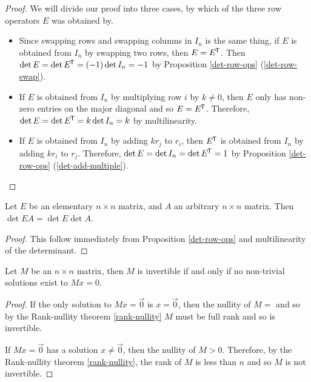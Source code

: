 \begin{proof}
    We will divide our proof into three cases, by which of the three row operators $E$ was obtained by.

    \begin{itemize}
        \item Since swapping rows and swapping columns in $I_n$ is the same thing, if $E$ is obtained from $I_n$ by swapping two rows, then $E = E^{\mkern-1.5mu\mathsf{T}}$. Then $\det E = \det E^{\mkern-1.5mu\mathsf{T}} = (-1)\det I_n = -1$ by Proposition \ref{det-row-ops} (\ref{det-row-swap}).
        \item If $E$ is obtained from $I_n$ by multiplying row $i$ by $k \neq 0$, then $E$ only has non-zero entries on the major diagonal and so $E = E^{\mkern-1.5mu\mathsf{T}}$. Therefore, $\det E = \det E^{\mkern-1.5mu\mathsf{T}} = k \det I_n = k$ by multilinearity.
        \item If $E$ is obtained from $I_n$ by adding $kr_j$ to $r_i$, then $E^{\mkern-1.5mu\mathsf{T}}$ is obtained from $I_n$ by adding $kr_i$ to $r_j$. Therefore, $\det E = \det I_n = \det E^{\mkern-1.5mu\mathsf{T}} = 1$ by Proposition \ref{det-row-ops} (\ref{det-add-multiple}).
    \end{itemize}
\end{proof}

\begin{lemma}\label{determinant-respects-elementary-product}
    Let $E$ be an elementary $n \times n$ matrix, and $A$ an arbitrary $n \times n$ matrix. Then $\det EA = \det E \det A$.
\end{lemma}

\begin{proof}
    This follow immediately from Proposition \ref{det-row-ops} and multilinearity of the determinant.
\end{proof}

\begin{lemma}\label{invertible-matrix-solutions}
    Let $M$ be an $n \times n$ matrix, then $M$ is invertible if and only if no non-trivial solutions exist to $Mx = 0$.
\end{lemma}

\begin{proof}
    If the only solution to $Mx = \vec{0}$ is $x = \vec{0}$, then the nullity of $M = $ and so by the Rank-nullity theorem \ref{rank-nullity} $M$ must be full rank and so is invertible.

    If $Mx = \vec{0}$ has a solution $x \neq \vec{0}$, then the nullity of $M > 0$. Therefore, by the Rank-nullity theorem \ref{rank-nullity}, the rank of $M$ is less than $n$ and so $M$ is not invertible.
\end{proof}


